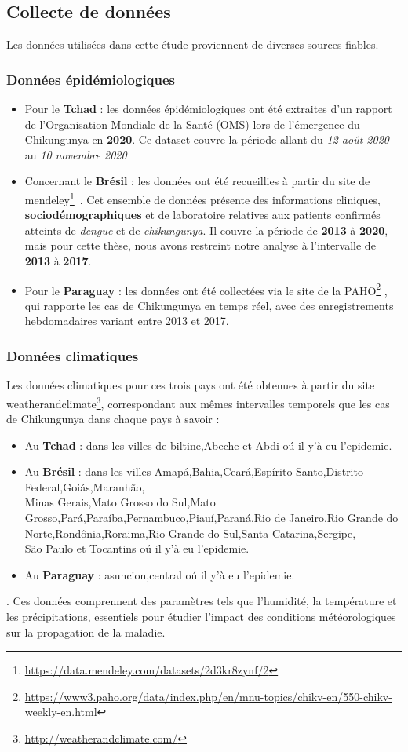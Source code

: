 \subsection{Collecte de données}
Les données utilisées dans cette étude proviennent de diverses sources fiables. 
\subsubsection{Données épidémiologiques}
\begin{itemize}
	\item Pour le \textbf{Tchad} : les données épidémiologiques ont été extraites d'un rapport~\cite{rapport2020oms} de l'Organisation Mondiale de la Santé (OMS) lors de l'émergence du Chikungunya en \textbf{2020}. Ce dataset couvre la période allant du \textit{12 août 2020} au \textit{10 novembre 2020}
	\item Concernant le \textbf{Brésil} : les données ont été recueillies à partir du site de mendeley\footnote{\url{https://data.mendeley.com/datasets/2d3kr8zynf/2}}~\cite{Oliveira2021}. Cet ensemble de données présente des informations cliniques, \textbf{sociodémographiques} et de laboratoire relatives aux patients confirmés atteints de \textit{dengue} et de \textit{chikungunya}. Il couvre la période de \textbf{2013} à \textbf{2020}, mais pour cette thèse, nous avons restreint notre analyse à l'intervalle de \textbf{2013} à \textbf{2017}.
	\item Pour le \textbf{Paraguay} : les données ont été collectées via le site de la PAHO\footnote{\url{https://www3.paho.org/data/index.php/en/mnu-topics/chikv-en/550-chikv-weekly-en.html}} , qui rapporte les cas de Chikungunya en temps réel, avec des enregistrements hebdomadaires variant entre 2013 et 2017.
\end{itemize}
\subsubsection{Données climatiques}
Les données climatiques pour ces trois pays ont été obtenues à partir du site weatherandclimate\footnote{\url{http://weatherandclimate.com/}}, correspondant aux mêmes intervalles temporels que les cas de Chikungunya dans chaque pays à savoir : 
\begin{itemize}
	\item Au \textbf{Tchad} : dans les villes de biltine,Abeche et Abdi oú il y'à eu l'epidemie.
	\item Au \textbf{Brésil} : dans les villes Amapá,Bahia,Ceará,Espírito Santo,Distrito Federal,Goiás,Maranhão,\\Minas Gerais,Mato Grosso do Sul,Mato Grosso,Pará,Paraíba,Pernambuco,Piauí,Paraná,Rio de Janeiro,Rio Grande do Norte,Rondônia,Roraima,Rio Grande do Sul,Santa Catarina,Sergipe,\\São Paulo et Tocantins oú il y'à eu l'epidemie.
	\item Au \textbf{Paraguay} : asuncion,central oú il y'à eu l'epidemie.
\end{itemize}.
Ces données comprennent des paramètres tels que l'humidité, la température et les précipitations, essentiels pour étudier l'impact des conditions météorologiques sur la propagation de la maladie.

